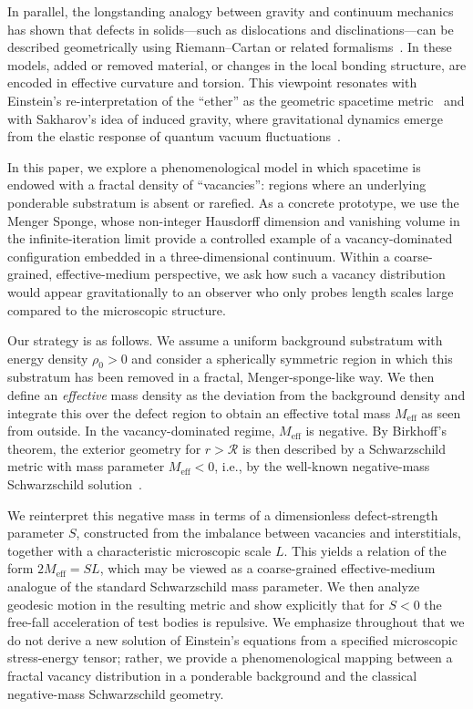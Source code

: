 \documentclass[%
  reprint,
  superscriptaddress,
  showpacs,
  showkeys,
  amsmath,amssymb,
  pra,
  longbibliography,
  floatfix,
  x11names
]{revtex4-2}
\begin{document}
In parallel, the longstanding analogy between gravity and continuum mechanics has shown that defects in solids---such as dislocations and disclinations---can be described geometrically using Riemann--Cartan or related formalisms~\cite{Kroner-1958,kroner-1990,kleinert-2004,zaanen-2022}. In these models, added or removed material, or changes in the local bonding structure, are encoded in effective curvature and torsion. This viewpoint resonates with Einstein's re-interpretation of the ``ether'' as the geometric spacetime metric~\cite{einstein-aether-en} and with Sakharov's idea of induced gravity, where gravitational dynamics emerge from the elastic response of quantum vacuum fluctuations~\cite{Sakharov-67}.

In this paper, we explore a phenomenological model in which spacetime is endowed with a fractal density of ``vacancies'': regions where an underlying ponderable substratum is absent or rarefied. As a concrete prototype, we use the Menger Sponge, whose non-integer Hausdorff dimension and vanishing volume in the infinite-iteration limit provide a controlled example of a vacancy-dominated configuration embedded in a three-dimensional continuum. Within a coarse-grained, effective-medium perspective, we ask how such a vacancy distribution would appear gravitationally to an observer who only probes length scales large compared to the microscopic structure.

Our strategy is as follows. We assume a uniform background substratum with energy density $\rho_0>0$ and consider a spherically symmetric region in which this substratum has been removed in a fractal, Menger-sponge-like way. We then define an \emph{effective} mass density as the deviation from the background density and integrate this over the defect region to obtain an effective total mass $M_{\text{eff}}$ as seen from outside. In the vacancy-dominated regime, $M_{\text{eff}}$ is negative. By Birkhoff's theorem, the exterior geometry for $r>\mathcal{R}$ is then described by a Schwarzschild metric with mass parameter $M_{\text{eff}}<0$, i.e., by the well-known negative-mass Schwarzschild solution~\cite{bondi-1957}.

We reinterpret this negative mass in terms of a dimensionless defect-strength parameter $S$, constructed from the imbalance between vacancies and interstitials, together with a characteristic microscopic scale $L$. This yields a relation of the form $2M_{\text{eff}} = SL$, which may be viewed as a coarse-grained effective-medium analogue of the standard Schwarzschild mass parameter. We then analyze geodesic motion in the resulting metric and show explicitly that for $S<0$ the free-fall acceleration of test bodies is repulsive. We emphasize throughout that we do not derive a new solution of Einstein's equations from a specified microscopic stress-energy tensor; rather, we provide a phenomenological mapping between a fractal vacancy distribution in a ponderable background and the classical negative-mass Schwarzschild geometry.
\end{document}
